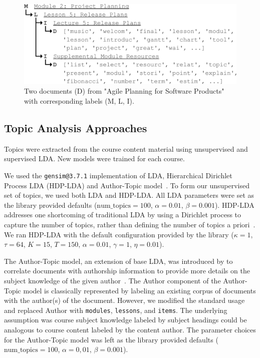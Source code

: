 \documentclass[sigconf, nonacm=true]{acmart}
\begin{document}
\begin{figure}
    \centering
    \includegraphics[width=\columnwidth]{figures/sample_doc}
    \caption{Two documents (D) from "Agile Planning for Software Products" with corresponding labels (M, L, I).}
    \label{fig:sample_doc}
\end{figure}

\subsection{Topic Analysis Approaches}
Topics were extracted from the course content material using unsupervised and supervised LDA.
New models were trained for each course.

We used the \texttt{gensim@3.7.1} implementation of LDA, Hierarchical Dirichlet Process LDA (HDP-LDA) and Author-Topic model~\cite{rehurek_lrec}.
To form our unsupervised set of topics, we used both LDA and HDP-LDA.
All LDA parameters were set as the library provided defaults ($\text{num\_topics}=100$, $\alpha=0.01$, $\beta=0.001$).
HDP-LDA addresses one shortcoming of traditional LDA by using a Dirichlet process to capture the number of topics, rather than defining the number of topics a priori~\cite{wang2011online}.
We ran HDP-LDA with the default configuration provided by the library ($\kappa=1$, $\tau=64$, $K=15$, $T=150$, $\alpha=0.01$, $\gamma=1$, $\eta=0.01$).

The Author-Topic model, an extension of base LDA, was introduced by \citeauthor{rosen2004author} to correlate documents with authorship information to provide more details on the subject knowledge of the given author~\cite{rosen2004author}.
The Author component of the Author-Topic model is classically represented by labeling an existing corpus of documents with the author(s) of the document.
However, we modified the standard usage and replaced Author with \texttt{modules}, \texttt{lessons}, and \texttt{items}.
The underlying assumption was course subject knowledge labeled by subject headings could be analogous to course content labeled by the content author.
The parameter choices for the Author-Topic model was left as the library provided defaults ($\text{num\_topics}=100$, $\alpha=0,01$, $\beta=0.001$).
\end{document}
